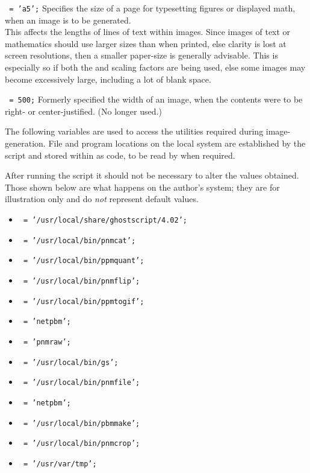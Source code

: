 \begin{htmllist}
\item [\fn{\$PAPERSIZE}\texttt{ = 'a5';}\label{papersize}]
Specifies the size of a page for typesetting figures
or displayed math, when an image is to be generated.\\
This affects the lengths of lines of text within images.
Since images of text or mathematics should use larger sizes than
when printed, else clarity is lost at screen resolutions,
then a smaller paper-size is generally advisable.
This is especially so if both the 
and  scaling factors are being used,
else some images may become excessively large, including a lot
of blank space.


\item [\fn{\$LINE\_WIDTH}\texttt{ = 500;}\label{linewidth}]
Formerly specified the width of an image, when the contents were
to be right- or center-justified. (No longer used.)

\end{htmllist}

\bigskip

\noindent
The following variables are used to access the utilities required during image-generation. 
File and program locations on the local system are established by the  
\Perl{} script and stored within  as \Perl{} code, 
to be read by  when required.

After running the  \Perl{} script it should not be necessary 
to alter the values obtained. Those shown below are what happens on the author's system;
they are for illustration only and do \emph{not} represent default values.
%

\begin{itemize}\label{graphicsutils}%
\item  {}\texttt{ = '/usr/local/share/ghostscript/4.02';}
\item  {}\texttt{ = '/usr/local/bin/pnmcat';}
\item  {}\texttt{ = '/usr/local/bin/ppmquant';}
\item  {}\texttt{ = '/usr/local/bin/pnmflip';}
\item  {}\texttt{ = '/usr/local/bin/ppmtogif';}
\item  {}\texttt{ = 'netpbm';}
\item  {}\texttt{ = 'pnmraw';}
\item  {}\texttt{ = '/usr/local/bin/gs';}
\item  {}\texttt{ = '/usr/local/bin/pnmfile';}
\item  {}\texttt{ = 'netpbm';}
\item  {}\texttt{ = '/usr/local/bin/pbmmake';}
\item  {}\texttt{ = '/usr/local/bin/pnmcrop';}
\item  {}\texttt{ = '/usr/var/tmp';}
\end{itemize}

